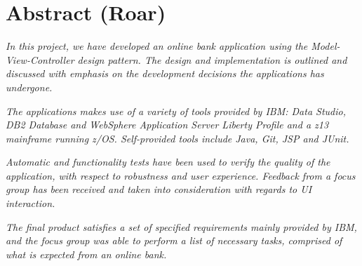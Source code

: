 \section*{Abstract (Roar)}

\textit{In this project, we have developed an online bank application using the Model-View-Controller design pattern. The design and implementation is outlined and discussed with emphasis on the development decisions the applications has undergone.}

\textit{The applications makes use of a variety of tools provided by IBM: Data Studio, DB2 Database and WebSphere Application Server Liberty Profile and a z13 mainframe running z/OS. Self-provided tools include Java, Git, JSP and JUnit.}

\textit{Automatic and functionality tests have been used to verify the quality of the application, with respect to robustness and user experience. Feedback from a focus group has been received and taken into consideration with regards to UI interaction.}

\textit{The final product satisfies a set of specified requirements mainly provided by IBM, and the focus group was able to perform a list of necessary tasks, comprised of what is expected from an online bank.}
